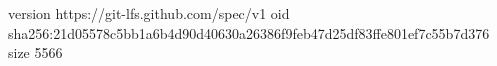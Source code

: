 version https://git-lfs.github.com/spec/v1
oid sha256:21d05578c5bb1a6b4d90d40630a26386f9feb47d25df83ffe801ef7c55b7d376
size 5566
